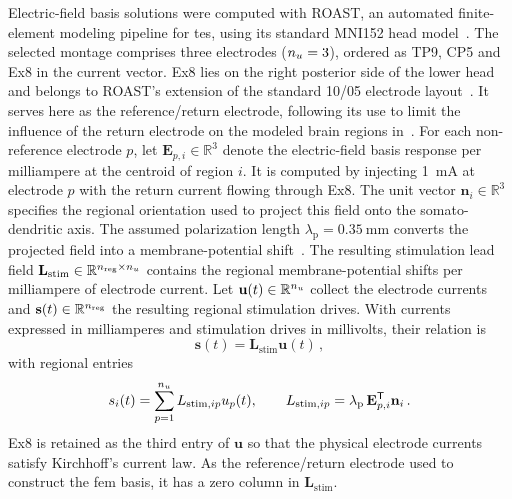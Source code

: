 Electric-field basis solutions were computed with ROAST, an automated finite-element modeling pipeline for \ac{tes}, using its standard MNI152 head model~\cite{Huang2019}.
The selected montage comprises three electrodes ($n_{u}=3$), ordered as TP9, CP5 and Ex8 in the current vector.
Ex8 lies on the right posterior side of the lower head and belongs to ROAST's extension of the standard 10/05 electrode layout~\cite{ROASTElectrodeLayout}.
It serves here as the reference/return electrode, following its use to limit the influence of the return electrode on the modeled brain regions in~\cite{Yu2024}.
For each non-reference electrode $p$, let $\mathbf{E}_{p,i}\in\mathbb{R}^{3}$ denote the electric-field basis response per milliampere at the centroid of region $i$.
It is computed by injecting \SI{1}{\milli\ampere} at electrode $p$ with the return current flowing through Ex8.
The unit vector $\mathbf{n}_i\in\mathbb{R}^{3}$ specifies the regional orientation used to project this field onto the somato-dendritic axis.
The assumed polarization length $\lambda_\mathrm{p}=\SI{0.35}{\milli\metre}$ converts the projected field into a membrane-potential shift~\cite{Radman2009}.
The resulting stimulation lead field $\mathbf{L}_\mathrm{stim}\in\mathbb{R}^{n_{\mathrm{reg}}{}\times n_{u}}$ contains the regional membrane-potential shifts per milliampere of electrode current.
Let $\mathbf{u}(t)\in\mathbb{R}^{n_{u}}$ collect the electrode currents and $\mathbf{s}(t)\in\mathbb{R}^{n_{\mathrm{reg}}{}}$ the resulting regional stimulation drives.
With currents expressed in milliamperes and stimulation drives in millivolts, their relation is
%
\begin{equation*}
    \mathbf{s}(t)=\mathbf{L}_\mathrm{stim}\mathbf{u}(t)\,,
\end{equation*}
%
with regional entries
%
\begin{equation*}
    s_i(t)=\sum_{p=1}^{n_{u}}L_{\mathrm{stim},ip}u_p(t),
    \qquad
    L_{\mathrm{stim},ip}
    =\lambda_\mathrm{p}\,\mathbf{E}_{p,i}^{\mathsf{T}}\mathbf{n}_i\,.
\end{equation*}
%
Ex8 is retained as the third entry of $\mathbf{u}$ so that the physical electrode currents satisfy Kirchhoff's current law.
As the reference/return electrode used to construct the \ac{fem} basis, it has a zero column in $\mathbf{L}_\mathrm{stim}$.

